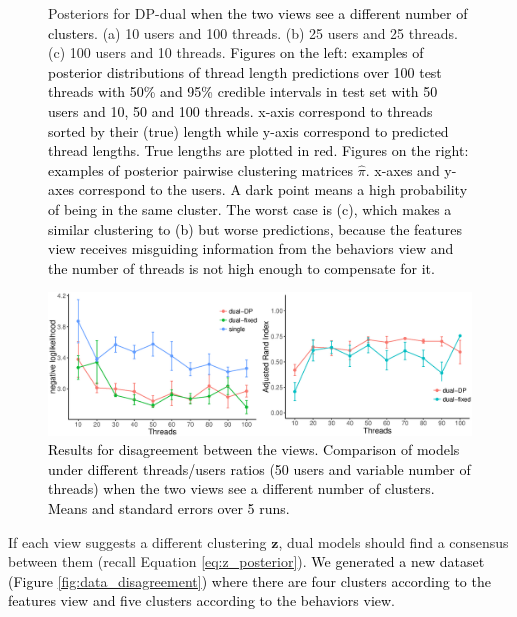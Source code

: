\documentclass[smallextended]{svjour3}          %
\newcommand\alberto[1]{\textcolor{black}{#1}}
\begin{document}
\begin{figure}
	\centering
	\caption{Posteriors for DP-dual \alberto{when the two views see a different number of clusters}. (a) 10 users and 100 threads. (b) 25 users and 25 threads. (c) 100 users and 10 threads. \alberto{Figures on the left: examples of posterior distributions of thread length predictions over 100 test threads with 50\% and 95\% credible intervals in test set with 50 users and 10, 50 and 100 threads. x-axis correspond to threads sorted by their (true) length while y-axis correspond to predicted thread lengths. True lengths are plotted in red. Figures on the right: examples of posterior pairwise clustering matrices $\hat{\pi}$. x-axes and y-axes correspond to the users. A dark point means a high probability of being in the same cluster. The worst case is (c), which makes a similar clustering to (b) but worse predictions, because the features view receives misguiding information from the behaviors view and the number of threads is not high enough to compensate for it.}}
	\label{fig:confused}
\end{figure}

\begin{figure}
	\centering

	\includegraphics[width=1\textwidth]{Fig6_results_disagreement}%
	\caption{\alberto{Results for disagreement between the views. Comparison of models under different threads/users ratios (50 users and variable number of threads) \alberto{when the two views see a different number of clusters}. Means and standard errors over 5 runs.}}
	\label{fig:results_disagreement}
\end{figure}



If each view suggests a different clustering $\mathbf{z}$, dual models should find a consensus between them (recall Equation \ref{eq:z_posterior}). \alberto{We generated a new dataset (Figure \ref{fig:data_disagreement}) where there are four clusters according to the features view and five clusters according to the behaviors view}.
\end{document}
